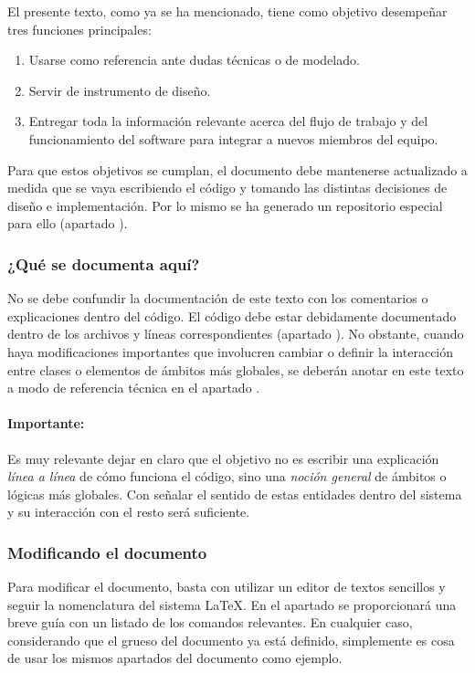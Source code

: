 El presente texto, como ya se ha mencionado, tiene como objetivo desempeñar tres funciones principales:
\begin{enumerate}[noitemsep]
	\item Usarse como referencia ante dudas técnicas o de modelado.
	
	\item Servir de instrumento de diseño.
	
	\item Entregar toda la información relevante acerca del flujo de trabajo y del funcionamiento del software para integrar a nuevos miembros del equipo.
\end{enumerate}

Para que estos objetivos se cumplan, el documento debe mantenerse actualizado a medida que se vaya escribiendo el código y tomando las distintas decisiones de diseño e implementación. Por lo mismo se ha generado un repositorio especial para ello (apartado ). 

\subsubsection*{¿Qué se documenta aquí?}
No se debe confundir la documentación de este texto con los comentarios o explicaciones dentro del código. El código debe estar debidamente documentado dentro de los archivos y líneas correspondientes (apartado ). No obstante, cuando haya modificaciones importantes que involucren cambiar o definir la interacción entre clases o elementos de ámbitos más globales, se deberán anotar en este texto a modo de referencia técnica en el apartado .

\paragraph*{Importante:}
Es muy relevante dejar en claro que el objetivo no es escribir una explicación \emph{línea a línea} de cómo funciona el código, sino una \emph{noción general} de ámbitos o lógicas más globales. Con señalar el sentido de estas entidades dentro del sistema y su interacción con el resto será suficiente.

\subsubsection{Modificando el documento}\label{flujo:modificando-el-documento}
Para modificar el documento, basta con utilizar un editor de textos sencillos y seguir la nomenclatura del sistema \LaTeX. En el apartado  se proporcionará una breve guía con un listado de los comandos relevantes. En cualquier caso, considerando que el grueso del documento ya está definido, simplemente es cosa de usar los mismos apartados del documento como ejemplo.


